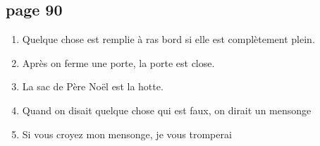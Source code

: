 \documentclass[letterpaper]{article}
\begin{document}
\doublespacing
\subsection*{page 90}
\begin{enumerate}
  \item
  Quelque chose est remplie à ras bord si elle est complètement plein.
  \item
  Après on ferme une porte, la porte est close.
  \item
  La sac de Père Noël est la hotte.
  \item
  Quand on disait quelque chose qui est faux, on dirait un mensonge
  \item
  Si vous croyez mon mensonge, je vous tromperai
\end{enumerate}
\end{document}
